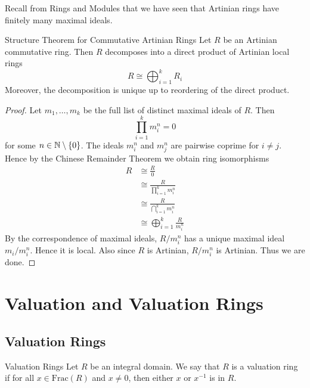 \documentclass[a4paper]{article}
\begin{document}
Recall from Rings and Modules that we have seen that Artinian rings have finitely many maximal ideals. 

\begin{thm}{Structure Theorem for Commutative Artinian Rings}{} Let $R$ be an Artinian commutative ring. Then $R$ decomposes into a direct product of Artinian local rings $$R\cong\bigoplus_{i=1}^k R_i$$ Moreover, the decomposition is unique up to reordering of the direct product.  \tcbline
\begin{proof}
Let $m_1,\dots,m_k$ be the full list of distinct maximal ideals of $R$. Then $$\prod_{i=1}^km_i^n=0$$ for some $n\in\mathbb{N}\setminus\{0\}$. The ideals $m_i^n$ and $m_j^n$ are pairwise coprime for $i\neq j$. Hence by the Chinese Remainder Theorem we obtain ring isomorphisms 
\begin{align*}
R&\cong\frac{R}{0}\\
&\cong\frac{R}{\prod_{i=1}^km_i^n}\\
&\cong\frac{R}{\bigcap_{i=1}^km_i^n}\tag{$m_i^n$ and $m_j^n$ pairwise coprime}\\
&\cong\bigoplus_{i=1}^k\frac{R}{m_i^n}\tag{CRT}
\end{align*}
By the correspondence of maximal ideals, $R/m_i^n$ has a unique maximal ideal $m_i/m_i^n$. Hence it is local. Also since $R$ is Artinian, $R/m_i^n$ is Artinian. Thus we are done. 
\end{proof}
\end{thm}

\pagebreak
\section{Valuation and Valuation Rings}
\subsection{Valuation Rings}
\begin{defn}{Valuation Rings}{} Let $R$ be an integral domain. We say that $R$ is a valuation ring if for all $x\in\text{Frac}(R)$ and $x\neq 0$, then either $x$ or $x^{-1}$ is in $R$. 
\end{defn}
\end{document}
